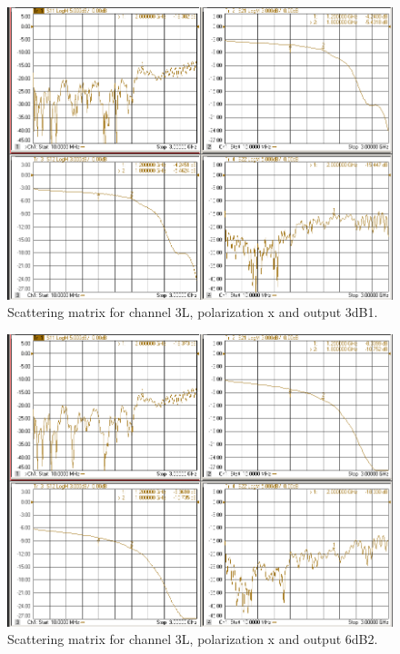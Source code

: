\documentclass[12pt,a4paper,oneside]{article}
\begin{document}
\begin{figure}[H]
\centering
\includegraphics[width=0.9\linewidth]{VNA_results/3Lx_3dB1.png}
\caption{Scattering matrix for channel 3L, polarization x and output 3dB1.}
\label{fig:3Lx_3dB1}
\end{figure}


\begin{figure}[H]
\centering
\includegraphics[width=0.9\linewidth]{VNA_results/3Lx_6dB2.png}
\caption{Scattering matrix for channel 3L, polarization x and output 6dB2.}
\label{fig:3Lx_6dB2}
\end{figure}
\end{document}
